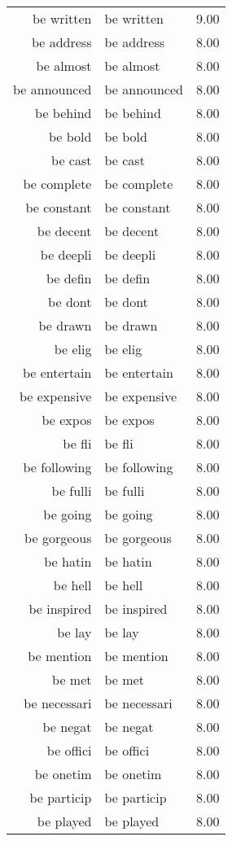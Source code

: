 \begin{table}[ht]
\begin{tabular}{rlr}
  be written & be written & 9.00 \\ 
  be address & be address & 8.00 \\ 
  be almost & be almost & 8.00 \\ 
  be announced & be announced & 8.00 \\ 
  be behind & be behind & 8.00 \\ 
  be bold & be bold & 8.00 \\ 
  be cast & be cast & 8.00 \\ 
  be complete & be complete & 8.00 \\ 
  be constant & be constant & 8.00 \\ 
  be decent & be decent & 8.00 \\ 
  be deepli & be deepli & 8.00 \\ 
  be defin & be defin & 8.00 \\ 
  be dont & be dont & 8.00 \\ 
  be drawn & be drawn & 8.00 \\ 
  be elig & be elig & 8.00 \\ 
  be entertain & be entertain & 8.00 \\ 
  be expensive & be expensive & 8.00 \\ 
  be expos & be expos & 8.00 \\ 
  be fli & be fli & 8.00 \\ 
  be following & be following & 8.00 \\ 
  be fulli & be fulli & 8.00 \\ 
  be going & be going & 8.00 \\ 
  be gorgeous & be gorgeous & 8.00 \\ 
  be hatin & be hatin & 8.00 \\ 
  be hell & be hell & 8.00 \\ 
  be inspired & be inspired & 8.00 \\ 
  be lay & be lay & 8.00 \\ 
  be mention & be mention & 8.00 \\ 
  be met & be met & 8.00 \\ 
  be necessari & be necessari & 8.00 \\ 
  be negat & be negat & 8.00 \\ 
  be offici & be offici & 8.00 \\ 
  be onetim & be onetim & 8.00 \\ 
  be particip & be particip & 8.00 \\ 
  be played & be played & 8.00 \\ 

\end{tabular}
\end{table}
